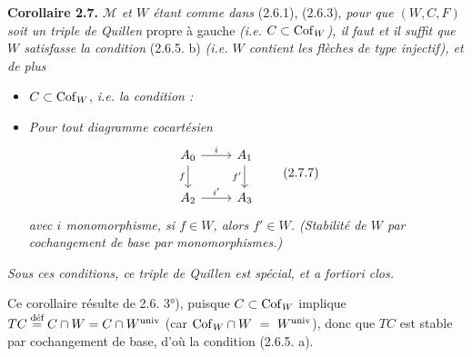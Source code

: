 \textbf{Corollaire 2.7.} \textit{$\mathcal{M}$ et $W$ étant comme dans} (2.6.1), (2.6.3), \textit{pour que $(W,C,F)$ soit un triple de Quillen} propre à gauche \textit{(i.e. $C \subset \Cof_W$), il faut et il suffit que $W$ satisfasse la condition} (2.6.5. b) \textit{(i.e. $W$ contient les flèches de type injectif), et de plus}

\begin{itemize}[leftmargin=7em]
\item[] $C \subset \Cof_W$, \textit{i.e. la condition :}
\item[a$'$)] \textit{Pour tout diagramme cocartésien}
\[ \begin{tikzcd}
A_0 \arrow[r, "i"] \arrow[d, "f"'] & A_1 \arrow[d, "f'"'] \\
A_2 \arrow[r, "i'"] & A_3
\end{tikzcd} \tag*{(2.7.7)} \]
\textit{avec $i$ monomorphisme, si $f \in W$, alors $f' \in W$. (Stabilité de $W$ par cochangement de base par monomorphismes.)}
\end{itemize}

\textit{Sous ces conditions, ce triple de Quillen est spécial, et a fortiori clos.}

Ce corollaire résulte de 2.6. 3°), puisque $C \subset \Cof_W$ implique $TC \deq C\cap W = C\cap W^{\mathrm{univ}}$ (car $\Cof_W \cap W \ = \ W^{\mathrm{univ}}$), donc que $TC$ est stable par cochangement de base, d'où la condition (2.6.5. a).

